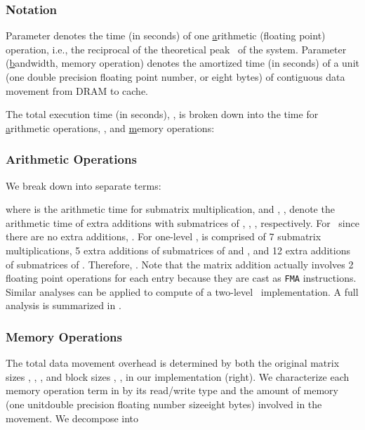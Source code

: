 \subsubsection*{Notation}
Parameter   denotes the time (in seconds) of one \underline{a}rithmetic (floating point) operation, i.e., the reciprocal of the theoretical peak \GFLOPS\ of the system.
Parameter  (\underline{b}andwidth, memory operation) denotes the amortized time (in seconds) of a unit (one double precision floating point number,
or eight bytes) of contiguous data movement from DRAM to cache.

The total execution time (in seconds), , is broken down into 
the time for \underline{a}rithmetic operations, , and
\underline{m}emory operations:






\subsubsection*{Arithmetic Operations}
We break down  into separate terms: 

where  is the arithmetic time for submatrix multiplication, and , ,  
denote the arithmetic time of extra additions with submatrices of , , , respectively. For \dgemm\, since there are no
extra additions, . For one-level \strassen{},  is comprised of 7 submatrix multiplications, 5 extra additions
of submatrices of  and , and 12 extra additions of submatrices of . Therefore, 
\fromto{}{}.
Note that the matrix addition actually involves 2 floating point operations for each entry because they are cast as
{\tt FMA} instructions.
Similar analyses can be applied to compute  of a two-level \strassen\ implementation.
A full analysis is summarized in .

\subsubsection*{Memory Operations}
The total data movement overhead is determined by both the original matrix sizes , , , and block sizes
, ,  in our implementation (right).
We characterize each memory operation term in  by its read/write type and the amount of memory (one unitdouble precision floating number sizeeight bytes) involved in the movement.
We decompose  into

